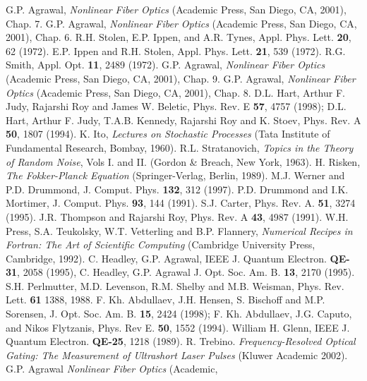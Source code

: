\begin{thebibliography}{99}
 G.P. Agrawal, {\em Nonlinear Fiber Optics} (Academic
Press, San Diego, CA, 2001), Chap. 7.
 G.P. Agrawal, {\em Nonlinear Fiber Optics} (Academic
Press, San Diego, CA, 2001), Chap. 6.
 R.H. Stolen, E.P. Ippen, and A.R. Tynes,
Appl. Phys. Lett. \textbf{20}, 62 (1972). 
 E.P. Ippen and R.H. Stolen, Appl. Phys. Lett. \textbf{21}, 
539 (1972). 
 R.G. Smith, Appl. Opt. \textbf{11}, 2489 (1972).
 G.P. Agrawal, {\em Nonlinear Fiber Optics} (Academic
Press, San Diego, CA, 2001), Chap. 9.
 G.P. Agrawal, {\em Nonlinear Fiber Optics} (Academic
Press, San Diego, CA, 2001), Chap. 8.
 D.L. Hart, Arthur F. Judy, Rajarshi Roy and James W. Beletic, Phys. Rev. E \textbf{57}, 4757 (1998); D.L. Hart, Arthur F. Judy, T.A.B. Kennedy, Rajarshi Roy and K. Stoev, Phys. Rev. A \textbf{50}, 1807 (1994).   
 K. Ito, {\em Lectures on Stochastic Processes} (Tata Institute of Fundamental Research, Bombay, 1960).
 R.L. Stratanovich, {\em Topics in the Theory of Random Noise}, Vols I. and II. (Gordon \& Breach, New York, 1963).
 H. Risken, {\em The Fokker-Planck Equation} (Springer-Verlag, Berlin, 1989).
 M.J. Werner and P.D. Drummond, J. Comput. Phys. \textbf{132}, 312 (1997).
 P.D. Drummond and I.K. Mortimer, J. Comput. Phys. \textbf{93}, 144 (1991).
 S.J. Carter, Phys. Rev. A. \textbf{51}, 3274 (1995).
 J.R. Thompson and Rajarshi Roy, Phys. Rev. A \textbf{43}, 4987 (1991).
 W.H. Press, S.A. Teukolsky, W.T. Vetterling and B.P. Flannery, {\em Numerical Recipes in Fortran: The Art of Scientific Computing} (Cambridge University Press, Cambridge, 1992).
 C. Headley, G.P. Agrawal, IEEE J. Quantum Electron. \textbf{QE-31}, 2058 (1995), C. Headley, G.P. Agrawal J. Opt. Soc. Am. B. \textbf{13}, 2170 (1995).
 S.H. Perlmutter, M.D. Levenson, R.M. Shelby and
M.B. Weisman, Phys. Rev. Lett. \textbf{61} 1388, 1988.
 F. Kh. Abdullaev, J.H. Hensen, S. Bischoff and M.P. Sorensen, J. Opt. Soc. Am. B. \textbf{15}, 2424 (1998); F. Kh. Abdullaev, J.G. Caputo, and Nikos Flytzanis, Phys. Rev E. \textbf{50}, 1552 (1994).
 William H. Glenn, IEEE J. Quantum Electron. \textbf{QE-25}, 1218 (1989).
 R. Trebino. {\em Frequency-Resolved Optical Gating: The Measurement of Ultrashort Laser Pulses} (Kluwer Academic 2002).
 G.P. Agrawal {\em Nonlinear Fiber Optics} (Academic,

\end{thebibliography}
